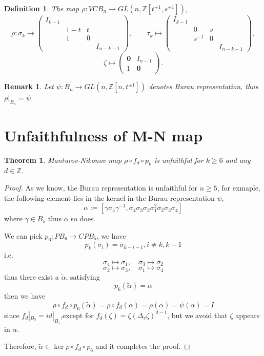 \documentclass{article}
\newtheorem{theorem}{Theorem}
\newtheorem{definition}{Definition}
\newtheorem{remark}{Remark}
\begin{document}
\begin{definition}
The map $\rho:VCB_n\rightarrow GL(n,\mathbb{Z}[t^{\pm 1},s^{\pm 1}])$, 
$$\rho:
         \sigma_k\mapsto \begin{pmatrix}
            I_{k-1}\\
            &1-t& t\\
            &1&0\\
            &&& I_{n-k-1}
         \end{pmatrix},\qquad 
         \tau_k\mapsto \begin{pmatrix}
         I_{k-1}\\
           &0&s\\
           &s^{-1}&0\\
           &&& I_{n-k-1}
         \end{pmatrix},$$ 
        $$\zeta\mapsto
         \begin{pmatrix}
            {\textbf{0}}&I_{n-1}\\
            1& {\textbf{0}}
         \end{pmatrix}.$$
\end{definition}
\begin{remark}
Let $\psi: B_n\rightarrow GL(n,\mathbb{Z}[n,t^{\pm 1} ])$ denotes Burau representation, thus $\rho|_{B_n}=\psi$. 
\end{remark}

\section{Unfaithfulness of M-N map}
\begin{theorem}
Manturov-Nikonov map $\rho\circ f_d\circ p_k$ is unfaithful for $k\geq 6$ and any $d\in \mathbb{Z}$.
\end{theorem}
\begin{proof}
As we know, the Burau representation is unfaithful for $n\geq 5$\cite{Big99}, for exmaple, the following element lies in the kernel in the Burau representation $\psi$,
$$\alpha:=[\gamma\sigma_4\gamma^{-1},\sigma_4\sigma_3\sigma_2\sigma_1^2\sigma_2\sigma_3\sigma_4]$$
where $\gamma\in B_5$ thus $\alpha$ so does. 

We can pick $p_6:PB_6\rightarrow CPB_5$, we have $$p_k(\sigma_i)=\sigma_{k-i-1}, i\neq k,k-1$$
i.e.
$$\sigma_4\mapsto \sigma_1,\quad\sigma_3\mapsto \sigma_2$$
$$\sigma_2\mapsto \sigma_3,\quad\sigma_1\mapsto \sigma_4$$
thus there exist a $\tilde{\alpha}$, satisfying
$$p_6(\tilde{\alpha})=\alpha$$
then we have 
$$\rho \circ f_d \circ p_6(\tilde{\alpha})=\rho \circ f_d(\alpha)=\rho (\alpha)=\psi(\alpha)=I$$
since $f_d|_ {B_5}=id|_ {B_5}$,except for $f_d(\zeta)=\zeta(\Delta_v\zeta)^{d-1}$, but we avoid that $\zeta$ appears in $\alpha$.

Therefore, $\tilde{\alpha}\in \ker \rho\circ f_d\circ p_6$ and it completes the proof. 
\end{proof}
\end{document}

